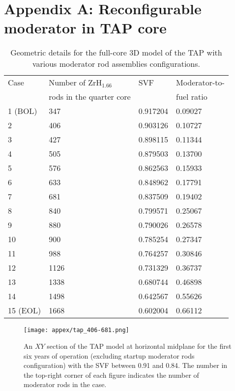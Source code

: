 \appendix
\chapter{Appendix A: Reconfigurable moderator in TAP core}
\label{appex:geometries}

\renewcommand{\thetable}{A.\arabic{table}}
\setcounter{table}{0}
\renewcommand{\thefigure}{A.\arabic{figure}}
\setcounter{figure}{0}
\begin{table}[h!]
	\caption{Geometric details for the full-core 3D model of the \gls{TAP} 
	with various moderator rod assemblies configurations. }
	\begin{tabularx}{\textwidth}{ X X X X}
		\hline
		Case & Number of ZrH$_{1.66}$ & \gls{SVF} & Moderator-to-\\ 
		     & rods in the quarter core   &          & fuel ratio			\\ 
		     \hline
		1 (\gls{BOL}) &  347          & 0.917204 & 0.09027              \\
		2    &        406             & 0.903126 & 0.10727              \\
		3    &        427             & 0.898115 & 0.11344              \\
		4    &        505             & 0.879503 & 0.13700              \\
		5    &        576             & 0.862563 & 0.15933 		        \\
		6    &        633             & 0.848962 & 0.17791      	    \\
		7    &		  681			  & 0.837509 & 0.19402	            \\
		8    &        840             & 0.799571 & 0.25067              \\
		9    &        880             & 0.790026 & 0.26578              \\
		10   &        900             & 0.785254 & 0.27347              \\
		11   &        988             & 0.764257 & 0.30846 		        \\
		12   &        1126	          & 0.731329 & 0.36737      	    \\
		13   &		  1338	    	  & 0.680744 & 0.46898	            \\
		14   &		  1498			  & 0.642567 & 0.55626	            \\
		15 (\gls{EOL})& 1668          & 0.602004 & 0.66112              \\
		\hline
	\end{tabularx}
	\label{tab:tap_adjustable_core}
\end{table}
\newpage
\begin{figure}[htp!] %
	\centering
	\texttt{[image: appex/tap\_406-681.png]}
	\caption{An $XY$ section of the \gls{TAP} model at horizontal midplane for 
	the first six years of operation (excluding startup moderator rods 
	configuration) with the \gls{SVF} between 0.91 and 0.84. The number in the 
	top-right corner of each figure indicates the number of moderator rods in 
	the case.}
	\label{fig:tap-406-681}
\end{figure}

